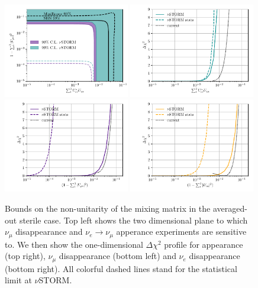 \begin{figure}[t]
\centering 
\includegraphics[width=0.49\textwidth]{figs/Averaged_joined.pdf}
\includegraphics[width=0.49\textwidth]{figs/Averaged_1D_app.pdf}
\\
\includegraphics[width=0.49\textwidth]{figs/Averaged_1D_dis.pdf}
\includegraphics[width=0.49\textwidth]{figs/Averaged_1D_edis.pdf}
\caption[Bounds and sensitivity of $\nu$STORM to averaged out sterile neutrinos.]{Bounds on the non-unitarity of the mixing matrix in the averaged-out sterile case. Top left shows the two dimensional plane to which $\nu_\mu$ disappearance and $\nu_e \to \nu_\mu$ apperance experiments are sensitive to. We then show the one-dimensional $\Delta \chi^2$ profile for appearance (top right), $\nu_\mu$ disappearance (bottom left) and $\nu_e$ disappearance (bottom right). All colorful dashed lines stand for the statistical limit at $\nu$STORM.\label{fig:non-uni}}
\end{figure}
%

